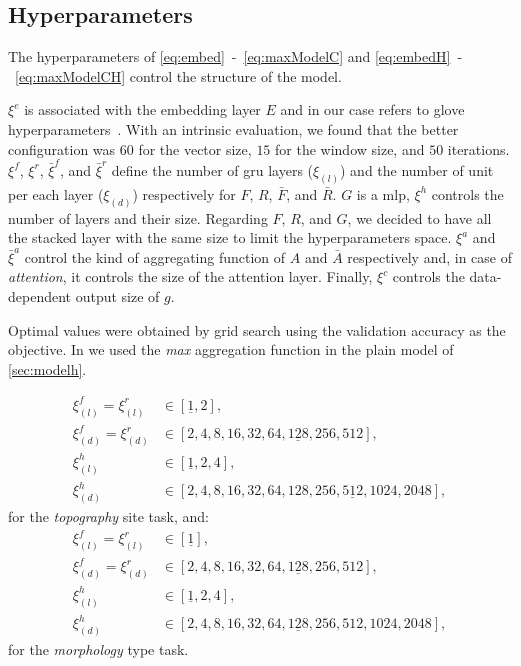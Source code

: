 

\subsection{Hyperparameters}\label{sec:hyperparameters}
The hyperparameters of \eqref{eq:embed}~-~\eqref{eq:maxModelC}
and \eqref{eq:embedH}~-~\eqref{eq:maxModelCH} control the structure of
the model.

$\xi^e$ is associated with the embedding layer $E$ and in our case
refers to \ac{glove} 
hyperparameters~\cite{pennington_glove:_2014}. With an intrinsic
evaluation, we found that the better configuration was $60$ for the vector
size, $15$ for the window size, and $50$ iterations. $\xi^f$,
$\xi^r$, $\bar{\xi}^{f}$, and $\bar{\xi}^{r}$ define the number of
\ac{gru} layers ($\xi_{(l)}$) and the number of unit per each layer
($\xi_{(d)}$) respectively for $F$, $R$, $\bar{F}$, and $\bar{R}$. 
$G$ is a \ac{mlp}, $\xi^h$ controls the number of
layers and their size. Regarding $F$, $R$, and $G$, we decided to
have all the stacked layer with 
the same size to limit the
hyperparameters space. $\xi^a$ and $\bar{\xi}^a$ control the
kind of aggregating function of $A$ and $\bar{A}$ respectively and, in case
of \emph{attention}, 
it controls the size of the attention layer. Finally, $\xi^c$ controls the
data-dependent output size of $g$.

Optimal values were obtained by grid search using the validation
accuracy as the objective.
In \maxp{} we used the \emph{max} aggregation function in the plain
model of \cref{sec:modelh}.

\begin{align*}
  \xi_{(l)}^f=\xi_{(l)}^r&\in[\underline{1},2],\\
  \xi_{(d)}^f=\xi_{(d)}^r&\in[2,4,8,16,32,64,\underline{128},256,512],\\
  \xi_{(l)}^h&\in[\underline{1},2,4],\\
  \xi_{(d)}^h&\in[2,4,8,16,32,64,128,256,\underline{512},1024,2048],
\end{align*}
for the \emph{topography} site task, and:
\begin{align*}
  \xi_{(l)}^f=\xi_{(l)}^r&\in[\underline{1}],\\
  \xi_{(d)}^f=\xi_{(d)}^r&\in[2,4,8,16,32,64,\underline{128},256,512],\\
  \xi_{(l)}^h&\in[\underline{1},2,4],\\
  \xi_{(d)}^h&\in[2,4,8,16,32,64,\underline{128},256,512,1024,2048],
\end{align*}
for the \emph{morphology} type task.


